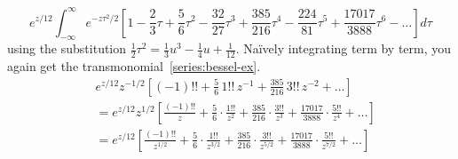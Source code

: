 \documentclass{article}
\begin{document}
\[ e^{z/12} \int_{-\infty}^\infty e^{-z\tau^2/2} \left[ 1 - \frac{2}{3} \tau + \frac{5}{6} \tau^2 - \frac{32}{27} \tau^3 + \frac{385}{216} \tau^4 - \frac{224}{81} \tau^5 + \frac{17017}{3888} \tau^6 - \ldots \right] d\tau \]
using the substitution $\tfrac{1}{2} \tau^2 = \tfrac{1}{3} u^3 - \tfrac{1}{4} u + \tfrac{1}{12}$. Na\"{i}vely integrating term by term, you again get the transmonomial~\eqref{series:bessel-ex}.
\color{DodgerBlue}
\begin{align*}
& e^{z/12} z^{-1/2} \left[ (-1)!! + \frac{5}{6}\,1!!\,z^{-1} + \frac{385}{216}\,3!!\,z^{-2} + \ldots \right] \\
& = e^{z/12} z^{1/2} \left[ \frac{(-1)!!}{z} + \frac{5}{6} \cdot \frac{1!!}{z^2} + \frac{385}{216} \cdot \frac{3!!}{z^3} + \frac{17017}{3888} \cdot \frac{5!!}{z^4} + \ldots \right] \\
& = e^{z/12} \left[ \frac{(-1)!!}{z^{1/2}} + \frac{5}{6} \cdot \frac{1!!}{z^{3/2}} + \frac{385}{216} \cdot \frac{3!!}{z^{5/2}} + \frac{17017}{3888} \cdot \frac{5!!}{z^{7/2}} + \ldots \right]
\end{align*}
\color{black}
\end{document}
